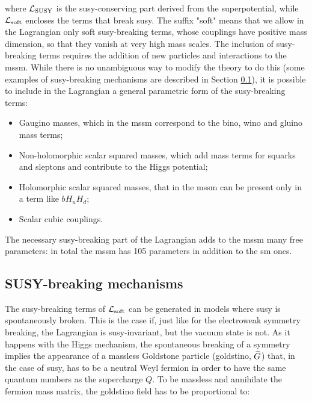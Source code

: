 \noindent where $\mathcal{L}_{\rm SUSY}$ is the \gls{susy}-conserving part derived from the superpotential, while $\mathcal{L}_{\rm soft}$ encloses the terms that break \gls{susy}. The suffix "soft" means that we allow in the Lagrangian only soft \gls{susy}-breaking terms, whose couplings have positive mass dimension, so that they vanish at very high mass scales. The inclusion of \gls{susy}-breaking terms requires the addition of new particles and interactions to the \gls{mssm}. While there is no unambiguous way to modify the theory to do this (some examples of \gls{susy}-breaking mechanisms are described in Section \ref{sec:susybreaking}), it is possible to include in the Lagrangian a general parametric form of the \gls{susy}-breaking terms:
\begin{itemize}
\item Gaugino masses, which in the \gls{mssm} correspond to the bino, wino and gluino mass terms;
\item Non-holomorphic scalar squared masses, which add mass terms for squarks and sleptons and contribute to the Higgs potential;
\item Holomorphic scalar squared masses, that in the \gls{mssm} can be present only in a term like $b H_u H_d$;
\item Scalar cubic couplings.
\end{itemize}  

The necessary \gls{susy}-breaking part of the Lagrangian adds to the \gls{mssm} many free parameters: in total the \gls{mssm} has 105 parameters in addition to the \gls{sm} ones.


\subsection{SUSY-breaking mechanisms}
\label{sec:susybreaking}

The \gls{susy}-breaking terms of $\mathcal{L}_{\rm soft}$ can be generated in models where \gls{susy} is spontaneously broken. This is the case if, just like  for the electroweak symmetry breaking, the Lagrangian is \gls{susy}-invariant, but the vacuum state is not. As it happens with the Higgs mechanism, the spontaneous breaking of a symmetry implies the appearance of a massless Goldstone particle (goldstino, $\widetilde{G}$) that, in the case of \gls{susy}, has to be a neutral Weyl fermion in order to have the same quantum numbers as the supercharge $Q$. To be massless and annihilate the fermion mass matrix, the goldstino field has to be proportional to:

